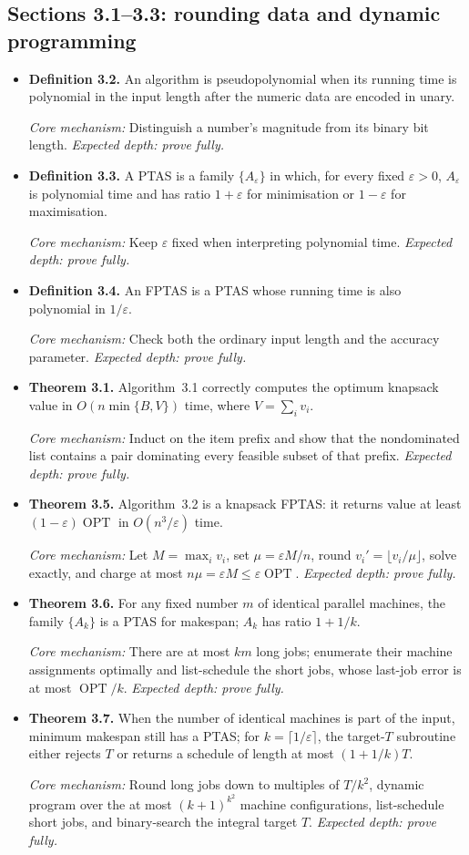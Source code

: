 \documentclass[11pt,a4paper]{article}
\newcommand{\OPT}{\operatorname{OPT}}
\newcommand{\1}{\mathbf 1}
\newcommand{\catalogue}[4]{%
  \item \textbf{#1.} #2\par
  {\footnotesize\emph{Core mechanism:} #3
  \emph{Expected depth: #4.}}}
\begin{document}
\subsection*{Sections 3.1--3.3: rounding data and dynamic programming}
\begin{itemize}
\catalogue{Definition 3.2}{An algorithm is pseudopolynomial when its running
time is polynomial in the input length after the numeric data are encoded in
unary.}{Distinguish a number's magnitude from its binary bit length.}
{prove fully}

\catalogue{Definition 3.3}{A PTAS is a family $\{A_\varepsilon\}$ in which,
for every fixed $\varepsilon>0$, $A_\varepsilon$ is polynomial time and has
ratio $1+\varepsilon$ for minimisation or $1-\varepsilon$ for maximisation.}
{Keep $\varepsilon$ fixed when interpreting polynomial time.}{prove fully}

\catalogue{Definition 3.4}{An FPTAS is a PTAS whose running time is also
polynomial in $1/\varepsilon$.}{Check both the ordinary input length and the
accuracy parameter.}{prove fully}

\catalogue{Theorem 3.1}{Algorithm~3.1 correctly computes the optimum knapsack
value in $O(n\min\{B,V\})$ time, where $V=\sum_i v_i$.}{Induct on the item
prefix and show that the nondominated list contains a pair dominating every
feasible subset of that prefix.}{prove fully}

\catalogue{Theorem 3.5}{Algorithm~3.2 is a knapsack FPTAS: it returns value at
least $(1-\varepsilon)\OPT$ in $O(n^3/\varepsilon)$ time.}{Let
$M=\max_i v_i$, set $\mu=\varepsilon M/n$, round
$v_i'=\lfloor v_i/\mu\rfloor$, solve exactly, and charge at most
$n\mu=\varepsilon M\leq\varepsilon\OPT$.}{prove fully}

\catalogue{Theorem 3.6}{For any fixed number $m$ of identical parallel
machines, the family $\{A_k\}$ is a PTAS for makespan; $A_k$ has ratio
$1+1/k$.}{There are at most $km$ long jobs; enumerate their machine
assignments optimally and list-schedule the short jobs, whose last-job error is
at most $\OPT/k$.}{prove fully}

\catalogue{Theorem 3.7}{When the number of identical machines is part of the
input, minimum makespan still has a PTAS; for $k=\lceil1/\varepsilon\rceil$,
the target-$T$ subroutine either rejects $T$ or returns a schedule of length
at most $(1+1/k)T$.}{Round long jobs down to multiples of $T/k^2$, dynamic
program over the at most $(k+1)^{k^2}$ machine configurations, list-schedule
short jobs, and binary-search the integral target $T$.}{prove fully}


\end{itemize}
\end{document}
